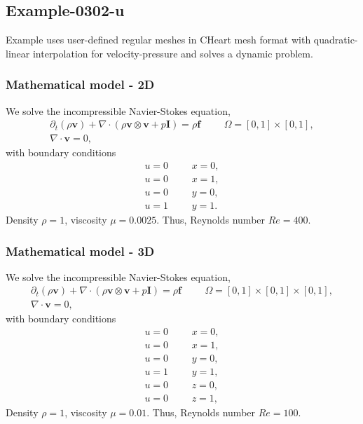 %
\clearpage
%
\subsection{Example-0302-u}
%
Example uses user-defined regular meshes in CHeart mesh format with quadratic-
linear interpolation for velocity-pressure and solves a dynamic problem.
%
%
\subsubsection{Mathematical model - 2D}
%
We solve the incompressible Navier-Stokes equation,
%
\begin{align}
    \partial_{t} (\rho \boldsymbol{v}) + \nabla \cdot (\rho \boldsymbol{v} \otimes \boldsymbol{v} + p \boldsymbol{I}) = \rho \boldsymbol{f} & &&\Omega = [0, 1] \times [0, 1], \\
    \nabla \cdot \boldsymbol{v} = 0,
\end{align}
%
with boundary conditions
%
\begin{align}
    u = 0 & &&x = 0, \\
    u = 0 & &&x = 1, \\
    u = 0 & &&y = 0, \\
    u = 1 & &&y = 1.
\end{align}
%
Density $\rho = 1$, viscosity $\mu = 0.0025$. Thus, Reynolds number $Re = 400$.
%
%
\subsubsection{Mathematical model - 3D}
%
We solve the incompressible Navier-Stokes equation,
%
\begin{align}
    \partial_{t} (\rho \boldsymbol{v}) + \nabla \cdot (\rho \boldsymbol{v} \otimes \boldsymbol{v} + p \boldsymbol{I}) = \rho \boldsymbol{f} & &&\Omega = [0, 1] \times [0, 1] \times [0, 1], \\
    \nabla \cdot \boldsymbol{v} = 0,
\end{align}
%
with boundary conditions
%
\begin{align}
    u = 0 & &&x = 0, \\
    u = 0 & &&x = 1, \\
    u = 0 & &&y = 0, \\
    u = 1 & &&y = 1, \\
    u = 0 & &&z = 0, \\
    u = 0 & &&z = 1,
\end{align}
%
Density $\rho = 1$, viscosity $\mu = 0.01$. Thus, Reynolds number $Re = 100$.
%
%
